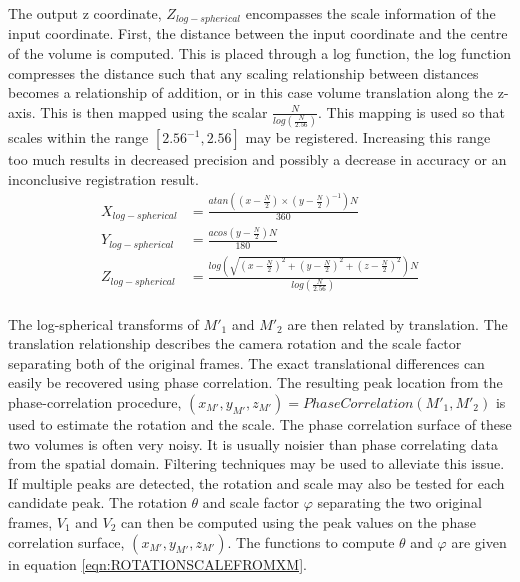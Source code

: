 The output z coordinate, $Z_{log-spherical}$ encompasses the scale information of the input coordinate. First, the distance between the input coordinate and the centre of the volume is computed. This is placed through a log function, the log function compresses the distance such that any scaling relationship between distances becomes a relationship of addition, or in this case volume translation along the z-axis. This is then mapped using the scalar $\frac{N}{log\left(\frac{N}{2.56}\right)}$. This mapping is used so that scales within the range $[2.56^{-1}, 2.56]$ may be registered. Increasing this range too much results in decreased precision and possibly a decrease in accuracy or an inconclusive registration result. \\


\begin{equation} \label{eqn:Log_Spherical}
\begin{split}
X_{log-spherical} & = \frac{atan\left(
\left( x-\frac{N}{2} \right) \times
\left(y-\frac{N}{2}\right)^{-1}
\right)N}{360}\\
Y_{log-spherical} & = \frac{acos\left(
y-\frac{N}{2}
\right)N}
{180} \\
Z_{log-spherical} & =\frac{log\left(
\sqrt{\left(x-\frac{N}{2}\right)^2+\left(y-\frac{N}{2}\right)^2+\left(z-\frac{N}{2}\right)^2}
\right)N}{log\left( \frac{N}{2.56} \right)} \\
\end{split}
\end{equation}

The log-spherical transforms of $M'_1$ and $M'_2$ are then related by translation. The translation relationship describes the camera rotation and the scale factor separating both of the original frames. The exact translational differences can easily be recovered using phase correlation. The resulting peak location from the phase-correlation procedure, $(x_{M'},y_{M'},z_{M'}) = PhaseCorrelation(M'_1, M'_2)$ is used to estimate the rotation and the scale. The phase correlation surface of these two volumes is often very noisy. It is usually noisier than phase correlating data from the spatial domain. Filtering techniques may be used to alleviate this issue. If multiple peaks are detected, the rotation and scale may also be tested for each candidate peak. The rotation $\theta$ and scale factor $\varphi$ separating the two original frames, $V_1$ and $V_2$ can then be computed using the peak values on the phase correlation surface, $(x_{M'},y_{M'},z_{M'})$. The functions to compute $\theta$ and $\varphi$ are given in equation \ref{eqn:ROTATIONSCALEFROMXM}. \\
 
